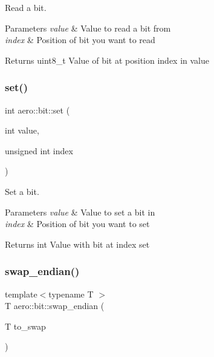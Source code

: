Read a bit. 


\begin{DoxyParams}{Parameters}
{\em value} & Value to read a bit from \\
\hline
{\em index} & Position of bit you want to read \\
\hline
\end{DoxyParams}
\begin{DoxyReturn}{Returns}
uint8\+\_\+t Value of bit at position index in value 
\end{DoxyReturn}
\mbox{\label{namespaceaero_1_1bit_a4ed6b0b921cdc3ddffb29fd68bbd78e6}} 
\subsubsection{\texorpdfstring{set()}{set()}}
{\footnotesize\ttfamily int aero\+::bit\+::set (\begin{DoxyParamCaption}\item[{int}]{value,  }\item[{unsigned int}]{index }\end{DoxyParamCaption})}



Set a bit. 


\begin{DoxyParams}{Parameters}
{\em value} & Value to set a bit in \\
\hline
{\em index} & Position of bit you want to set \\
\hline
\end{DoxyParams}
\begin{DoxyReturn}{Returns}
int Value with bit at index set 
\end{DoxyReturn}
\mbox{\label{namespaceaero_1_1bit_a6353e436ee2a0a7ca0ad70469b93cee9}} 
\subsubsection{\texorpdfstring{swap\+\_\+endian()}{swap\_endian()}}
{\footnotesize\ttfamily template$<$typename T $>$ \\
T aero\+::bit\+::swap\+\_\+endian (\begin{DoxyParamCaption}\item[{T}]{to\+\_\+swap }\end{DoxyParamCaption})}



